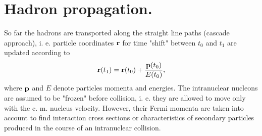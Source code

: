 \section{Hadron propagation.}

\hspace{1.0em}
So far the hadrons are transported along the straight line paths (cascade 
approach), i. e. particle coordinates ${\bf r}$ for time "shift" 
between $t_0$ and 
$t_1$ are updated according to
\begin{equation}
\label{HP1} {\bf r}(t_1) = {\bf r}(t_0) + \frac{ {\bf p}(t_0)}{E(t_0)},
\end{equation}
where ${\bf p}$ and $E$ denote particles momenta and energies. 
The intranuclear nucleons are assumed to be "frozen" before collision,
i. e.  they are allowed to move only with the c. m. nucleus velocity.
However, their Fermi momenta are taken into account to find interaction
cross sections or characteristics of secondary particles produced in the
course of an intranuclear collision.  

